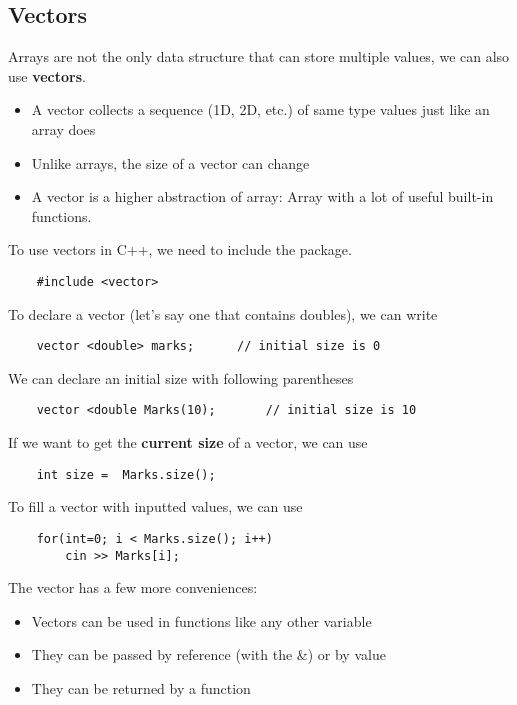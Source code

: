 \documentclass[]{article}
\begin{document}
\subsection{Vectors}
\bigbreak

Arrays are not the only data structure that can store multiple values, we can also use \textbf{vectors}.

\begin{itemize}
	\item A vector collects a sequence (1D, 2D, etc.) of same type values just like an array does
	\item Unlike arrays, the size of a vector can change
	\item A vector is a higher abstraction of array: Array with a lot of useful built-in functions.
\end{itemize}\bigbreak

To use vectors in C++, we need to include the package.

\begin{lstlisting}
	#include <vector>
\end{lstlisting}\bigbreak

To declare a vector (let's say one that contains doubles), we can write

\begin{lstlisting}
	vector <double> marks;		// initial size is 0
\end{lstlisting}\bigbreak

We can declare an initial size with following parentheses

\begin{lstlisting}
	vector <double Marks(10);		// initial size is 10
\end{lstlisting}\bigbreak

If we want to get the \textbf{current size} of a vector, we can use

\begin{lstlisting}
	int size =  Marks.size();
\end{lstlisting}\bigbreak

To fill a vector with inputted values, we can use

\begin{lstlisting}
	for(int=0; i < Marks.size(); i++)
		cin >> Marks[i];
\end{lstlisting}\bigbreak

The vector has a few more conveniences:

\begin{itemize}
	\item Vectors can be used in functions like any other variable
	\item They can be passed by reference (with the \&) or by value
	\item They can be returned by a function
\end{itemize}\bigbreak
\end{document}
